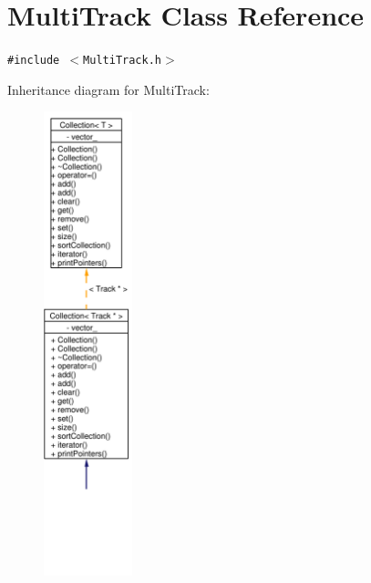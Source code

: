 \hypertarget{classMultiTrack}{
\section{Multi\-Track Class Reference}
\label{classMultiTrack}
}
{\tt \#include $<$Multi\-Track.h$>$}

Inheritance diagram for Multi\-Track:\begin{figure}[H]
\begin{center}
\leavevmode
\includegraphics[width=73pt]{classMultiTrack__inherit__graph}
\end{center}
\end{figure}
